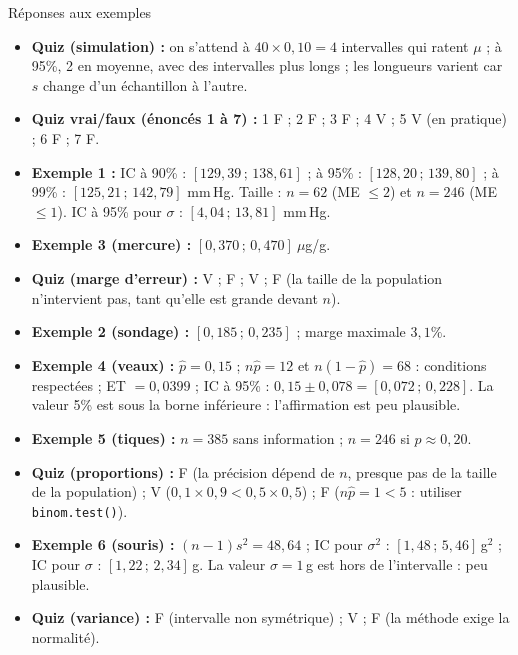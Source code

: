 \documentclass{BeamerTemplate}
\begin{document}
\begin{frame}[t]{Réponses aux exemples}
  \scriptsize
  \begin{itemize}\itemsep 1.2mm
    \item \textbf{Quiz (simulation) :} on s'attend à $40 \times 0{,}10 = 4$ intervalles qui ratent $\mu$ ; à 95\%, 2 en moyenne, avec des intervalles plus longs ; les longueurs varient car $s$ change d'un échantillon à l'autre.
    \item \textbf{Quiz vrai/faux (énoncés 1 à 7) :} 1 F ; 2 F ; 3 F ; 4 V ; 5 V (en pratique) ; 6 F ; 7 F.
    \item \textbf{Exemple 1 :} IC à 90\% : $[129{,}39 \,;\, 138{,}61]$ ; à 95\% : $[128{,}20 \,;\, 139{,}80]$ ; à 99\% : $[125{,}21 \,;\, 142{,}79]$ mm\,Hg. Taille : $n = 62$ (ME $\le 2$) et $n = 246$ (ME $\le 1$). IC à 95\% pour $\sigma$ : $[4{,}04 \,;\, 13{,}81]$ mm\,Hg.
    \item \textbf{Exemple 3 (mercure) :} $[0{,}370 \,;\, 0{,}470]\ \mu$g/g.
    \item \textbf{Quiz (marge d'erreur) :} V ; F ; V ; F (la taille de la population n'intervient pas, tant qu'elle est grande devant $n$).
    \item \textbf{Exemple 2 (sondage) :} $[0{,}185 \,;\, 0{,}235]$ ; marge maximale $3{,}1\%$.
    \item \textbf{Exemple 4 (veaux) :} $\hat{p} = 0{,}15$ ; $n\hat{p} = 12$ et $n(1-\hat{p}) = 68$ : conditions respectées ; ET $= 0{,}0399$ ; IC à 95\% : $0{,}15 \pm 0{,}078 = [0{,}072 \,;\, 0{,}228]$. La valeur 5\% est sous la borne inférieure : l'affirmation est peu plausible.
    \item \textbf{Exemple 5 (tiques) :} $n = 385$ sans information ; $n = 246$ si $p \approx 0{,}20$.
    \item \textbf{Quiz (proportions) :} F (la précision dépend de $n$, presque pas de la taille de la population) ; V ($0{,}1\times0{,}9 < 0{,}5\times0{,}5$) ; F ($n\hat{p} = 1 < 5$ : utiliser \texttt{binom.test()}).
    \item \textbf{Exemple 6 (souris) :} $(n-1)s^2 = 48{,}64$ ; IC pour $\sigma^2$ : $[1{,}48 \,;\, 5{,}46]$\,g$^2$ ; IC pour $\sigma$ : $[1{,}22 \,;\, 2{,}34]$\,g. La valeur $\sigma = 1$\,g est hors de l'intervalle : peu plausible.
    \item \textbf{Quiz (variance) :} F (intervalle non symétrique) ; V ; F (la méthode exige la normalité).
  \end{itemize}
\end{frame}
\end{document}
